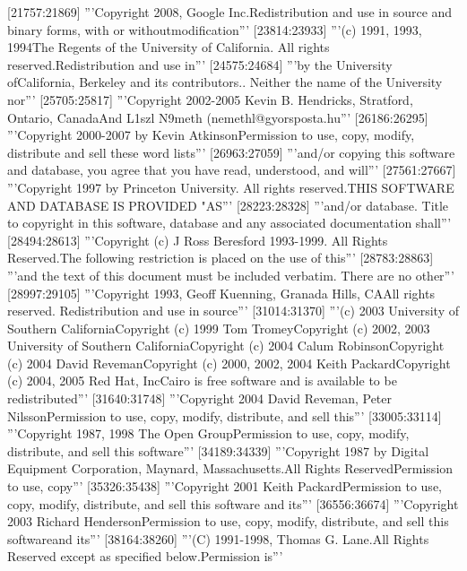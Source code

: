 \documentclass[10pt,a4paper]{article}
\begin{document}
{[21757:21869] '''Copyright 2008, Google Inc.\n\n  Redistribution and use in source and binary forms, with or without\n  modification'''
[23814:23933] '''(c) 1991, 1993, 1994\n  The Regents of the University of California.  All rights reserved.\n \n  Redistribution and use in'''
[24575:24684] '''by the University of\n  California, Berkeley and its contributors.. Neither the name of the University nor'''
[25705:25817] '''Copyright 2002-2005 Kevin B. Hendricks, Stratford, Ontario, Canada\n  And L\xa1szl N\xa9meth (nemethl@gyorsposta.hu'''
[26186:26295] '''Copyright 2000-2007 by Kevin Atkinson\n  Permission to use, copy, modify, distribute and sell these word lists'''
[26963:27059] '''and/or copying this software \n  and database, you agree that you have read, understood, and will'''
[27561:27667] '''Copyright 1997 by Princeton University.  All rights reserved.\n  THIS SOFTWARE AND DATABASE IS PROVIDED "AS'''
[28223:28328] '''and/or database.  Title to copyright in this \n  software, database and any associated documentation shall'''
[28494:28613] '''Copyright (c) J Ross Beresford 1993-1999. All Rights Reserved.\n  The following restriction is placed on the use of this'''
[28783:28863] '''and the text of this document must be \n  included verbatim.   There are no other'''
[28997:29105] '''Copyright 1993, Geoff Kuenning, Granada Hills, CA\n   All rights reserved.   Redistribution and use in source'''
[31014:31370] '''(c) 2003 University of Southern California\n  Copyright (c) 1999 Tom Tromey\n  Copyright (c) 2002, 2003 University of Southern California\n  Copyright (c) 2004 Calum Robinson\n  Copyright (c) 2004 David Reveman\n  Copyright (c) 2000, 2002, 2004 Keith Packard\n  Copyright (c) 2004, 2005 Red Hat, Inc\n\n  Cairo is free software and is available to be redistributed'''
[31640:31748] '''Copyright  2004 David Reveman, Peter Nilsson\n\n  Permission to use, copy, modify, distribute, and sell this'''
[33005:33114] '''Copyright 1987, 1998  The Open Group\n  \n  Permission to use, copy, modify, distribute, and sell this software'''
[34189:34339] '''Copyright 1987 by Digital Equipment Corporation, Maynard, Massachusetts.\n  \n                          All Rights Reserved\n  \n  Permission to use, copy'''
[35326:35438] '''Copyright  2001 Keith Packard\n  \n  Permission to use, copy, modify, distribute, and sell this software and its'''
[36556:36674] '''Copyright  2003 Richard Henderson\n  \n  Permission to use, copy, modify, distribute, and sell this software\n  and its'''
[38164:38260] '''(C) 1991-1998, Thomas G. Lane.\n  All Rights Reserved except as specified below.\n\n  Permission is'''
}
\end{document}
